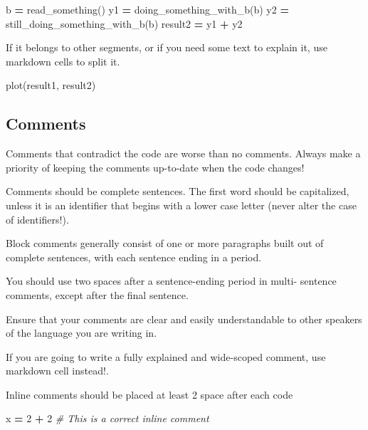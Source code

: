 \documentclass[
]{book}
\newenvironment{Shaded}{\begin{snugshade}}{\end{snugshade}}
\newcommand{\CommentTok}[1]{\textcolor[rgb]{0.56,0.35,0.01}{\textit{#1}}}
\newcommand{\DecValTok}[1]{\textcolor[rgb]{0.00,0.00,0.81}{#1}}
\newcommand{\NormalTok}[1]{#1}
\newcommand{\OperatorTok}[1]{\textcolor[rgb]{0.81,0.36,0.00}{\textbf{#1}}}
\begin{document}
\begin{Shaded}
\begin{Highlighting}[]
\NormalTok{b }\OperatorTok{=}\NormalTok{ read\_something()}
\NormalTok{y1 }\OperatorTok{=}\NormalTok{ doing\_something\_with\_b(b)}
\NormalTok{y2 }\OperatorTok{=}\NormalTok{ still\_doing\_something\_with\_b(b)}
\NormalTok{result2 }\OperatorTok{=}\NormalTok{ y1 }\OperatorTok{+}\NormalTok{ y2}
\end{Highlighting}
\end{Shaded}

If it belongs to other segments, or if you need some text to explain it, use markdown cells to split it.

\begin{Shaded}
\begin{Highlighting}[]
\NormalTok{plot(result1, result2)}
\end{Highlighting}
\end{Shaded}

\hypertarget{comments}{%
\subsection{Comments}\label{comments}}

Comments that contradict the code are worse than no comments. Always make a priority of keeping the comments up-to-date when the code changes!

Comments should be complete sentences. The first word should be capitalized, unless it is an identifier that begins with a lower case letter (never alter the case of identifiers!).

Block comments generally consist of one or more paragraphs built out of complete sentences, with each sentence ending in a period.

You should use two spaces after a sentence-ending period in multi- sentence comments, except after the final sentence.

Ensure that your comments are clear and easily understandable to other speakers of the language you are writing in.

If you are going to write a fully explained and wide-scoped comment, use markdown cell instead!.

Inline comments should be placed at least 2 space after each code

\begin{Shaded}
\begin{Highlighting}[]
\NormalTok{x }\OperatorTok{=} \DecValTok{2} \OperatorTok{+} \DecValTok{2}  \CommentTok{\# This is a correct inline comment}
\end{Highlighting}
\end{Shaded}
\end{document}
